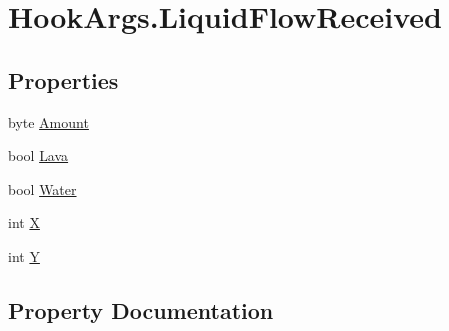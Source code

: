 \hypertarget{structOTA_1_1Plugin_1_1HookArgs_1_1LiquidFlowReceived}{}\section{Hook\+Args.\+Liquid\+Flow\+Received}
\label{structOTA_1_1Plugin_1_1HookArgs_1_1LiquidFlowReceived}
\subsection*{Properties}
\begin{DoxyCompactItemize}
\item 
byte \hyperlink{structOTA_1_1Plugin_1_1HookArgs_1_1LiquidFlowReceived_add756aa4d6b5f1cc0f24fb5258fe927d}{Amount}
\item 
bool \hyperlink{structOTA_1_1Plugin_1_1HookArgs_1_1LiquidFlowReceived_aea81f84f0edd332a013ced52c1560410}{Lava}
\item 
bool \hyperlink{structOTA_1_1Plugin_1_1HookArgs_1_1LiquidFlowReceived_a3e1e3bb9fdba8b77c02b5d9f77eedc13}{Water}
\item 
int \hyperlink{structOTA_1_1Plugin_1_1HookArgs_1_1LiquidFlowReceived_a80c0944640e62d3ed6c5419c1bcc0c88}{X}
\item 
int \hyperlink{structOTA_1_1Plugin_1_1HookArgs_1_1LiquidFlowReceived_aa482c4cc86a24474e4fb19b5b5978778}{Y}
\end{DoxyCompactItemize}


\subsection{Property Documentation}
\hypertarget{structOTA_1_1Plugin_1_1HookArgs_1_1LiquidFlowReceived_add756aa4d6b5f1cc0f24fb5258fe927d}{}

